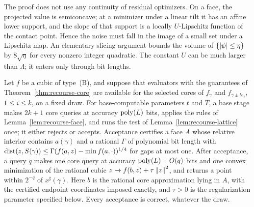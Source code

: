 The proof does not use any continuity of residual optimizers. On a
face, the projected value is semiconcave; at a minimizer under a linear
tilt it has an affine lower support, and the slope of that support is a
locally $U$-Lipschitz function of the contact point. Hence the noise
must fall in the image of a small set under a Lipschitz map. An
elementary slicing argument bounds the volume of
$\{\left\lvert\psi\right\rvert\le\eta\}$ by $8\sqrt\eta$ for every nonzero integer
quadratic. The constant $U$ can be much larger than $\Lambda$; it enters
only through bit lengths.

\begin{proposition}
\label{prop:recourse-completion}
Let $f$ be a cubic of type~(B), and suppose that evaluators with the
guarantees of Theorem~\ref{thm:recourse-core} are available for the
selected cores of $f_\gamma$ and $f_{\gamma\pm te_i}$, $1\le i\le k$, on
a fixed draw. For base-computable parameters $t$ and $T$, a base stage
makes $2k+1$ core queries at accuracy $\operatorname{poly}(L)$ bits, applies the rules
of Lemma~\ref{lem:recourse-face}, and runs the test of
Lemma~\ref{lem:recourse-lattice} once; it either rejects or accepts.
Acceptance certifies a face $A$ whose relative interior contains
$a(\gamma)$ and a rational $\Gamma$ of polynomial bit length with
$\operatorname{dist}(z,S(\gamma))\le\Gamma(f(a,z)-\min f(a,\cdot))^{1/4}$ for gaps at
most one. After acceptance, a query $q$ makes one core query at
accuracy $\operatorname{poly}(L)+O(q)$ bits and one convex minimization of the
rational cubic $z\mapsto f(b,z)+\tau\left\lVert z\right\rVert^2$, and returns a point
within $2^{-q}$ of $x^\sharp(\gamma)$. Here $b$ is the rational core
approximation lying in $A$, with the certified endpoint coordinates imposed
exactly, and $\tau>0$ is the regularization parameter specified below.
Every acceptance is correct, whatever the draw.
\end{proposition}

